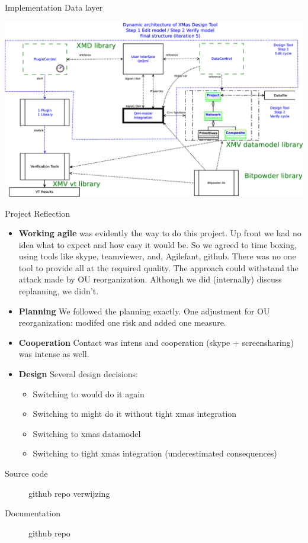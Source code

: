\documentclass[11pt]{beamer}
\begin{document}
\begin{frame}{Implementation Data layer}

	\includegraphics[width=.95\linewidth]{pictures/1c-architecture-dynamic-2}

\end{frame}

\begin{frame}{Project Reflection}
	\begin{itemize}
		\item {\bf Working agile} was evidently the way to do this project. Up front
				we had no idea what to expect and how easy it would be. So we agreed
				to time boxing, using tools like skype, teamviewer, and, Agilefant, github.
				There was no one tool to provide all at the required quality.
				The approach could withstand the attack made by OU reorganization. Although we
				did (internally) discuss replanning, we didn't.
		\item {\bf Planning} We followed the planning exactly. One adjustment for OU reorganization: modifed one risk
				and added one measure.
		\item {\bf Cooperation} Contact was intens and cooperation (skype + screensharing) was intense as
				well. 
		\item {\bf Design} Several design decisions:
			\begin{itemize}
				\item Switching to \qt				 would do it again
				\item Switching to \qml				 might do it without tight xmas integration
				\item Switching to xmas datamodel
				\item Switching to tight xmas integration (underestimated consequences)
			\end{itemize}
	\end{itemize}
\end{frame}

\begin{frame}
	\begin{description}
		\item[Source code] github repo verwijzing
		\item[Documentation] github repo
	\end{description}
\end{frame}
\end{document}
